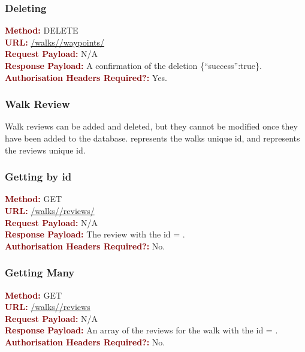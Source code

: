 \documentclass[11pt,a4paper]{report}
\begin{document}
\subsubsection{Deleting}
\textbf{\textcolor{Maroon}{Method:}} DELETE\\
\textbf{\textcolor{Maroon}{URL:}} \url{/walks/}\url{/waypoints/}\\
\textbf{\textcolor{Maroon}{Request Payload:}} N/A\\
\textbf{\textcolor{Maroon}{Response Payload:}} A confirmation of the deletion \{``success'':true\}.\\
\textbf{\textcolor{Maroon}{Authorisation Headers Required?:}} Yes.

\subsubsection{Walk Review}

Walk reviews can be added and deleted, but they cannot be modified once they have been added to the database.  represents the walks unique id, and  represents the reviews unique id.

\subsubsection{Getting by id}
\textbf{\textcolor{Maroon}{Method:}} GET\\
\textbf{\textcolor{Maroon}{URL:}} \url{/walks/}\url{/reviews/}\\
\textbf{\textcolor{Maroon}{Request Payload:}} N/A\\
\textbf{\textcolor{Maroon}{Response Payload:}} The review with the id = .\\
\textbf{\textcolor{Maroon}{Authorisation Headers Required?:}} No.

\subsubsection{Getting Many}
\textbf{\textcolor{Maroon}{Method:}} GET\\
\textbf{\textcolor{Maroon}{URL:}} \url{/walks/}\url{/reviews}\\
\textbf{\textcolor{Maroon}{Request Payload:}} N/A\\
\textbf{\textcolor{Maroon}{Response Payload:}} An array of the reviews for the walk with the id = .\\
\textbf{\textcolor{Maroon}{Authorisation Headers Required?:}} No.
\end{document}
